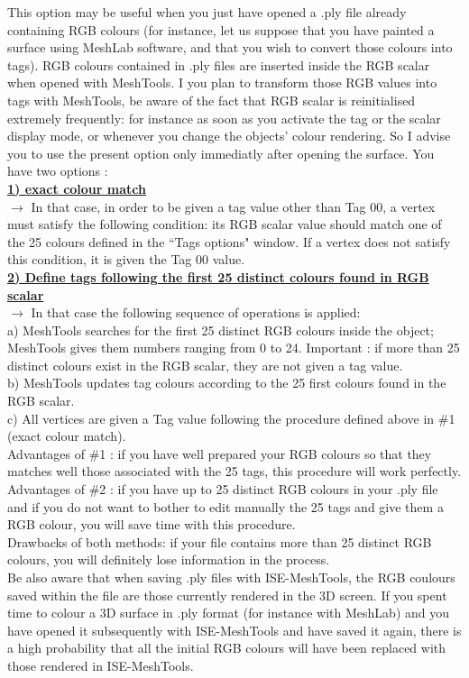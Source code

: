 This option may be useful when you just
have opened a .ply file already containing
RGB colours (for instance, let us suppose
that you have painted a surface using
MeshLab software, and that you wish to
convert those colours into tags). RGB
colours contained in .ply files are inserted
inside the RGB scalar when opened with
MeshTools. I you plan to transform those RGB values into tags with MeshTools, be aware of the fact
that RGB scalar is reinitialised extremely frequently: for instance as soon as you activate the tag or the scalar display mode, or whenever you change the objects' colour rendering. So I advise you to use the present option only immediatly after opening the surface.
You have two options :\\
\textbf{\underline{1) exact colour match}}\\
$\rightarrow$ In that case, in order to be given a tag value other than Tag 00, a vertex must satisfy the following condition: its RGB scalar value should match one of the 25 colours defined in the ``Tags options" window. If a vertex does not satisfy this condition, it is given the Tag 00 value.\\
\textbf{\underline{2) Define tags following the first 25 distinct colours found in RGB scalar}}\\
$\rightarrow$ In that case the following sequence of operations is applied:\\
a) MeshTools searches for the first 25 distinct RGB colours inside the object; MeshTools gives them numbers ranging from 0 to 24. Important : if more than 25 distinct colours exist in the RGB scalar, they are not given a tag value.\\
b) MeshTools updates tag colours according to the 25 first colours found in the RGB scalar.\\
c) All vertices are given a Tag value following the procedure defined above in \#1 (exact colour match).\\
Advantages of \#1 : if you have well prepared your RGB colours so that they matches well those associated with the 25 tags, this procedure will work perfectly.\\
Advantages of \#2 : if you have up to 25 distinct RGB colours in your .ply file and if you do not want to bother to edit manually the 25 tags and give them a RGB colour, you will save time with this procedure. 
\\Drawbacks of both methods: if your file contains more than 25 distinct RGB colours, you will definitely lose information in the process.
\\Be also aware that when saving .ply files with ISE-MeshTools, the RGB coulours saved within the file are those currently rendered in the 3D screen. If you spent time to colour a 3D surface in .ply format (for instance with MeshLab) and you have opened it subsequently with ISE-MeshTools and have saved it again, there is a high probability that all the initial RGB colours will have been replaced with those rendered in ISE-MeshTools.


